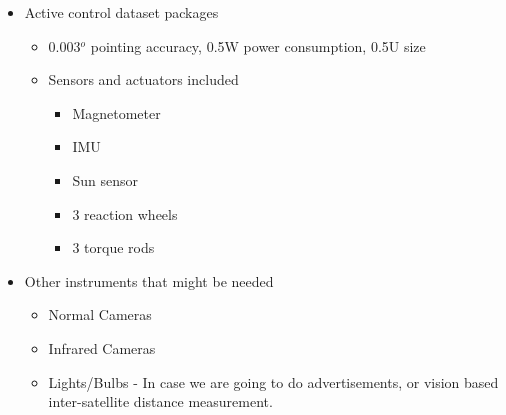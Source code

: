 \documentclass[11pt,a4paper]{article}
\begin{document}
\begin{itemize}
\item Active control dataset packages 
\begin{itemize}
\item 0.003$^o$ pointing accuracy, 0.5W power consumption, 0.5U size 
\item Sensors and actuators included
\begin{itemize}
\item Magnetometer
\item IMU
\item Sun sensor
\item 3 reaction wheels 
\item 3 torque rods
\end{itemize}
\end{itemize}

\item Other instruments that might be needed
\begin{itemize}
\item Normal Cameras
\item Infrared Cameras
\item Lights/Bulbs - In case we are going to do advertisements, or vision based inter-satellite distance measurement. 
\end{itemize}
\end{itemize}
\end{document}

